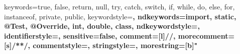  {
    keywords={true, false, return, null, try, catch, switch, if, while, do, else, for, instanceof, private, public},
    keywordstyle=\color{blue}\bfseries,
    ndkeywords={import, static, @Test, @Override, int, double, class},
    ndkeywordstyle=\color{violet}\bfseries,
    identifierstyle=\color{black},
    sensitive=false,
    comment=[l]{//},
    morecomment=[s]{/*}{*/},
    commentstyle=\color{gray}\ttfamily,
    stringstyle=\color{dkgreen}\ttfamily,
    morestring=[b]"
}

\newcommand{\Java}[3]{
    \kodeprintstyle{#1}{#2}{#3}{Java}
}
